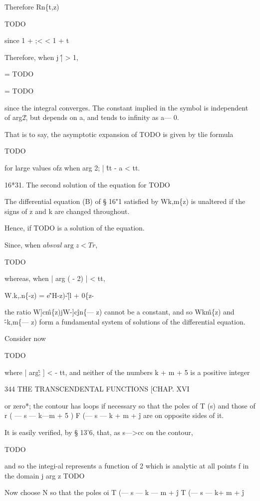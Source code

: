 %
%

Therefore Rn\{t,z)

TODO

since 1 + ;< < 1 + t

Therefore, when j \^ | > 1,

= TODO

= TODO

since the integral converges. The constant implied in the symbol is
independent of arg2\^, but depends on a, and tends to infinity as a—
0.

That is to say, the asymptotic expansion of TODO is given by tlie
formula

TODO

for large values ofz when arg 2; | \^ tt - a < tt.

16*31. The second solution of the equation for TODO

The differential equation (B) of § 16"1 satisfied by Wk,m\{z) is
unaltered if the signs of z and k are changed throughout.

Hence, if TODO is a solution of the equation.

Since, when $absval{\arg z} < Tr$,

TODO

whereas, when | arg ( - 2) | < tt,

W.k,.n\{-z) = e\^'H-z)-\^[l + 0\{z-%

the ratio W]c\^m\{z)jW-]c\^jn\{— z) cannot be a constant, and so
Wk\^m\{z) and \^-k,m\{— z) form a fundamental system of solutions of
the differential equation.


Consider now

TODO

where | arg\^; ] < - tt, and neither of the numbers k + m + 5 is a
positive integer



344 THE TRANSCENDENTAL FUNCTIONS [CHAP. XVI

or zero*; the contour has loops if necessary so that the poles of T
(s) and those of r ( — s — k—m + 5 ) F (— s — k + m + \^j are on
opposite sides of it.

It is easily verified, by § 13'6, that, as s—>cc on the contour,

TODO

and so the integi-al represents a function of 2 which is analytic at
all points f in the domain j arg z TODO

Now choose N so that the poles oi T (— s — k — m + \^j T (— s — k+ m +
\^j

